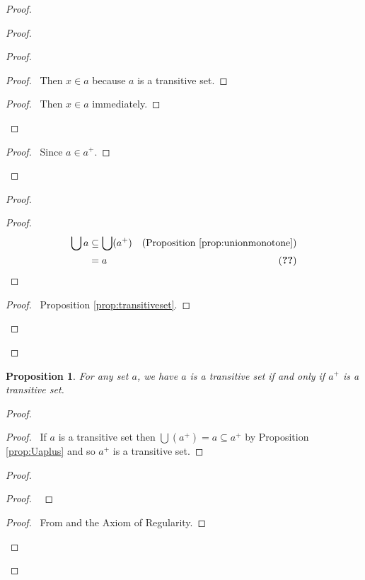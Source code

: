 \documentclass{book}
\let\qed\relax
\newtheorem{prop}[ax]{Proposition}
\theoremstyle{definition}
\begin{document}
\begin{proof}
\pf
{}
\begin{proof}
\begin{proof}
	\begin{proof}
		\pf\ Then $x \in a$ because $a$ is a transitive set.
	\end{proof}
	\begin{proof}
		\pf\ Then $x \in a$ immediately.
	\end{proof}
\end{proof}
\begin{proof}
	\pf\ Since $a \in a^+$.
\end{proof}
\end{proof}
\begin{proof}
	\begin{proof}
		\pf
		\begin{align*}
			\bigcup a & \subseteq \bigcup (a^+) & (\text{Proposition \ref{prop:unionmonotone}}) \\
			& = a & (\text{\stepref{1}})
		\end{align*}
	\end{proof}
	\begin{proof}
		\pf\ Proposition \ref{prop:transitiveset}.
	\end{proof}
\end{proof}
\qed
\end{proof}

\begin{prop}
\label{prop:successortransitive}
For any set $a$, we have $a$ is a transitive set if and only if $a^+$ is a transitive set.
\end{prop}

\begin{proof}
\pf
{}
\begin{proof}
	\pf\ If $a$ is a transitive set then $\bigcup(a^+) = a \subseteq a^+$ by Proposition \ref{prop:Uaplus} and so $a^+$ is a transitive set.
\end{proof}
\begin{proof}
	\begin{proof}
		\pf\ 
	\end{proof}
	\begin{proof}
		\pf\ From  and the Axiom of Regularity.
	\end{proof}
\end{proof}
\qed
\end{proof}
\end{document}
